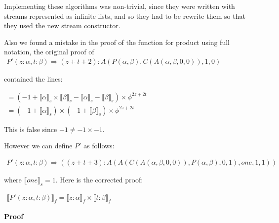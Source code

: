 \documentclass{cs4rep}
\begin{document}
Implementing these algorithms was non-trivial, since they were
written with streams represented as infinite lists, and so they had to
be rewrite them so that they used the new stream constructor.

Also we found a mistake in the proof of the function for product using full notation, the original proof of
\( \begin{array}{l} P'(z:\alpha,t:\beta) \Rightarrow
  (z+t+2):A(P(\alpha,\beta),C(A(\alpha,\beta,0,0)),1,0)
\end{array} \)

contained the lines:

\( \begin{array}{l}
  =(-1+\llbracket \alpha \rrbracket_{s}\times \llbracket \beta \rrbracket_{s} - \llbracket \alpha \rrbracket_{s} - \llbracket \beta \rrbracket_{s}) \times \phi^{2z+2t} \\
  =(-1+\llbracket \alpha \rrbracket_{s})\times(-1+\llbracket \beta
  \rrbracket_{s}) \times \phi^{2z+2t}
\end{array} \)

This is false since $-1 \neq -1 \times -1$.

However we can define $P'$ as follows:

\( \begin{array}{l}
P'(z:\alpha, t:\beta) \Rightarrow ((z+t+3):A(A(C(A(\alpha,\beta,0,0)),P(\alpha,\beta),0,1),one,1,1))
\end{array} \)

where $\llbracket one \rrbracket_{s} = 1$. Here is the corrected proof:

\begin{myprop}
\( \begin{array}{l}
\llbracket P'(z:\alpha, t:\beta) \rrbracket_{f} = \llbracket z:\alpha \rrbracket_{f} \times \llbracket t:\beta \rrbracket_{f}
\end{array}\)
\end{myprop}

{\bf Proof}
\end{document}
